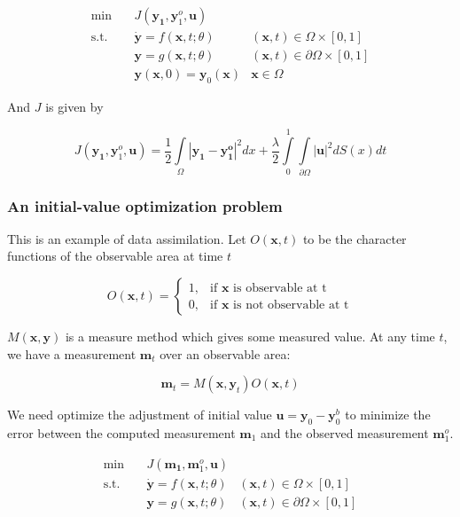 \documentclass{article}
\begin{document}
$$
\begin{array}{rcll}
\min &~& J(\mathbf{y_1}, \mathbf{y}_1^o, \mathbf{u}) & \\
\mathrm{s.t.} &~& \dot{\mathbf{y}} = f(\mathbf{x}, t; \theta) & (\mathbf{x}, t) \in \Omega \times [0, 1] \\
&~& \mathbf{y} = g(\mathbf{x}, t; \theta) & (\mathbf{x}, t) \in \partial \Omega \times [0, 1] \\
&~& \mathbf{y}(\mathbf{x}, 0) = \mathbf{y}_0(\mathbf{x}) & \mathbf{x} \in \Omega
\end{array}
$$

And $ J $ is given by

$$
J(\mathbf{y_1}, \mathbf{y}_1^o, \mathbf{u}) = \frac{1}{2} \int\limits_{\Omega}|\mathbf{y_1} - \mathbf{y_1^o}|^2dx +  \frac{\lambda}{2} \int\limits_{0}^{1}\int\limits_{\partial \Omega} |\mathbf{u}|^2 dS(x) dt
$$

\subsubsection{An initial-value optimization problem}

This is an example of data assimilation. Let $ O(\mathbf{x}, t) $ to be the character functions of the observable area at time $t$

$$
O(\mathbf{x}, t) = \begin{cases}
1, & \text{if }\mathbf{x}\text{ is observable at t} \\
0, & \text{if }\mathbf{x}\text{ is not observable at t}
\end{cases}
$$

$ M(\mathbf{x}, \mathbf{y}) $ is a measure method which gives some measured value. At any time $ t $, we have a measurement $\mathbf{m}_t$ over an observable area:

$$ \mathbf{m}_t = M(\mathbf{x}, \mathbf{y}_t) O(\mathbf{x}, t) $$

We need optimize the adjustment of initial value $ \mathbf{u} = \mathbf{y}_0 - \mathbf{y}_0^b $  to minimize the error between the computed measurement $ \mathbf{m}_1 $ and the observed measurement $ \mathbf{m}_1^o $.

$$
\begin{array}{rcll}
\min &~& J(\mathbf{m_1}, \mathbf{m}_1^o, \mathbf{u}) & \\
\mathrm{s.t.} &~& \dot{\mathbf{y}} = f(\mathbf{x}, t; \theta) & (\mathbf{x}, t) \in \Omega \times [0, 1] \\
&~& \mathbf{y} = g(\mathbf{x}, t; \theta) & (\mathbf{x}, t) \in \partial \Omega \times [0, 1] \\
\end{array}
$$
\end{document}
